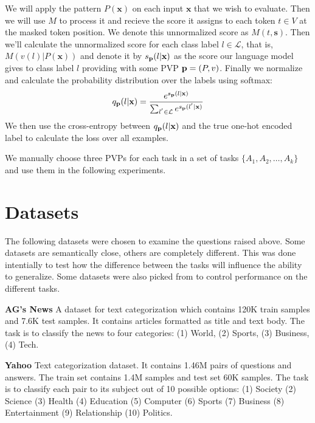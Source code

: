 \documentclass[11pt,a4paper]{article}
\begin{document}
We will apply the pattern $P(\textbf{x})$ on each input $\textbf{x}$ that we wish to evaluate.
Then we will use $M$ to process it and recieve the score it assigns to each token $t\in{}V$ at the masked token position.
We denote this unnormalized score as $M(t, \textbf{s})$.
Then we'll calculate the unnormalized score for each class label $l\in{}\mathcal{L}$, that is, $M(v(l) | P(\textbf{x}))$ and denote it by $s_{\text{\textbf{p}}}(l|\textbf{x})$ as the score our language model gives to class label $l$ providing with some PVP $\text{\textbf{p}}=(P, v)$.
Finally we normalize and calculate the probability distribution over the labels using softmax:
\[
	q_\text{\textbf{p}}(l|\textbf{x}) = \frac{e^{s_{\text{\textbf{p}}}(l|\textbf{x})}}{\sum_{l^{'}\in{}\mathcal{L}}e^{s_{\text{\textbf{p}}}(l^{'}|\textbf{x})}}
\]
We then use the cross-entropy between $q_\text{\textbf{p}}(l|\textbf{x})$ and the true one-hot encoded label to calculate the loss over all examples. 

We manually choose three PVPs for each task in a set of tasks $\{A_1, A_2, \dots, A_k\}$ and use them in the following experiments.



\section{Datasets}

The following datasets were chosen to examine the questions raised above.
Some datasets are semantically close, others are completely different.
This was done intentially to test how the difference between the tasks will influence the ability to generalize. 
Some datasets were also picked from \citet{schick2020exploiting} to control performance on the different tasks.

\vspace{8pt}
\noindent \textbf{AG's News} \quad
A dataset for text categorization which contains 120K train samples and 7.6K test samples.
It contains articles formatted as title and text body.
The task is to classify the news to four categories: (1) World, (2) Sports, (3) Business, (4) Tech.

\vspace{8pt}
\noindent \textbf{Yahoo} \quad
Text categorization dataset. It contains 1.46M pairs of questions and answers.
The train set contains 1.4M samples and test set 60K samples.
The task is to classify each pair to its subject out of 10 possible options: (1) Society (2) Science (3) Health (4) Education (5) Computer (6) Sports (7) Business (8) Entertainment (9) Relationship (10) Politics.
\end{document}
